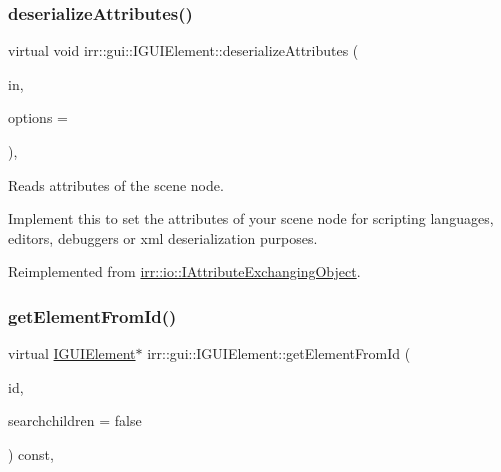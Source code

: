 \subsubsection{\texorpdfstring{deserialize\+Attributes()}{deserializeAttributes()}}
{\footnotesize\ttfamily virtual void irr\+::gui\+::\+I\+G\+U\+I\+Element\+::deserialize\+Attributes (\begin{DoxyParamCaption}\item[{\hyperlink{classirr_1_1io_1_1IAttributes}{io\+::\+I\+Attributes} $\ast$}]{in,  }\item[{\hyperlink{structirr_1_1io_1_1SAttributeReadWriteOptions}{io\+::\+S\+Attribute\+Read\+Write\+Options} $\ast$}]{options = {} }\end{DoxyParamCaption})\hspace{0.3cm}{\ttfamily [inline]}, {\ttfamily [virtual]}}



Reads attributes of the scene node. 

Implement this to set the attributes of your scene node for scripting languages, editors, debuggers or xml deserialization purposes. 

Reimplemented from \hyperlink{classirr_1_1io_1_1IAttributeExchangingObject_a013d4ead3736d7fab4bc18c2d61a3e2e}{irr\+::io\+::\+I\+Attribute\+Exchanging\+Object}.

\mbox{\label{classirr_1_1gui_1_1IGUIElement_ab79b8e81d2f2864312345cffe9237cce}} 
\subsubsection{\texorpdfstring{get\+Element\+From\+Id()}{getElementFromId()}}
{\footnotesize\ttfamily virtual \hyperlink{classirr_1_1gui_1_1IGUIElement}{I\+G\+U\+I\+Element}$\ast$ irr\+::gui\+::\+I\+G\+U\+I\+Element\+::get\+Element\+From\+Id (\begin{DoxyParamCaption}\item[{\hyperlink{namespaceirr_ac66849b7a6ed16e30ebede579f9b47c6}{s32}}]{id,  }\item[{bool}]{searchchildren = {\ttfamily false} }\end{DoxyParamCaption}) const\hspace{0.3cm}{\ttfamily [inline]}, {\ttfamily [virtual]}}



